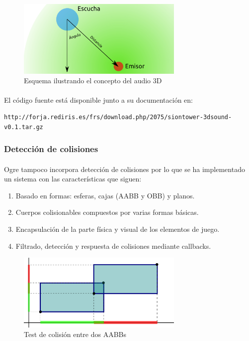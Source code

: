\documentclass[16pt,spanish]{article}
\begin{document}
\begin{figure}[H]
    \centering
        \includegraphics[width=8cm]{img/audio3d.png} 
    \caption{Esquema ilustrando el concepto del audio 3D}
    \label{img:audio3D}
\end{figure}

\paragraph{}
El código fuente está disponible junto a su documentación en:

\begin{verbatim}
http://forja.rediris.es/frs/download.php/2075/siontower-3dsound-v0.1.tar.gz
\end{verbatim}

\subsubsection{Detección de colisiones}

\paragraph{}
Ogre tampoco incorpora detección de colisiones por lo que se ha implementado
un sistema con las características que siguen:

\begin{enumerate}
    \item Basado en formas: esferas, cajas (AABB y OBB) y planos.
    \item Cuerpos colisionables compuestos por varias formas básicas.
    \item Encapsulación de la parte física y visual de los elementos de juego.
    \item Filtrado, detección y respuesta de colisiones mediante callbacks.
\end{enumerate}

\begin{figure}[H]
    \centering
        \includegraphics[width=8cm]{img/test-aabb-aabb.png} 
    \caption{Test de colisión entre dos AABBs}
    \label{img:aabb-aabb}
\end{figure}
\end{document}
